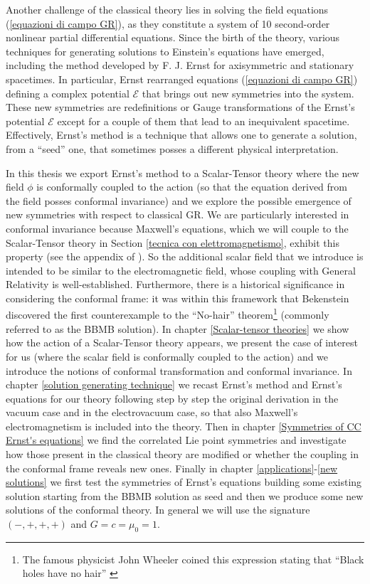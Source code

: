 Another challenge of the classical theory lies in solving the field equations (\ref{equazioni di campo GR}), as they constitute a system of 10 second-order nonlinear partial differential equations. Since the birth of the theory, various techniques for generating solutions to Einstein's equations have emerged, including the method developed by F. J. Ernst \citep{ernst1} for axisymmetric and stationary spacetimes. In particular, Ernst rearranged equations (\ref{equazioni di campo GR}) defining a complex potential $\mathcal{E}$ that brings out new symmetries into the system. These new symmetries are redefinitions or Gauge transformations of the Ernst's potential $\mathcal{E}$ except for a couple of them that lead to an inequivalent spacetime. Effectively, Ernst's method is a technique that allows one to generate a solution, from a ``seed'' one, that sometimes posses a different physical interpretation. 
\vspace{0.5 pt} 

In this thesis we export Ernst's method to a Scalar-Tensor theory where the new field $\phi$ is conformally coupled to the action (so that the equation derived from the field posses conformal invariance) and we explore the possible emergence of new symmetries with respect to classical GR. We are particularly interested in conformal invariance because Maxwell's equations, which we will couple to the Scalar-Tensor theory in Section \ref{tecnica con elettromagnetismo}, exhibit this property (see the appendix of \citep{wald2010general}). So the additional scalar field that we introduce is intended to be similar to the electromagnetic field, whose coupling with General Relativity is well-established. Furthermore, there is a historical significance in considering the conformal frame: it was within this framework that Bekenstein \citep{BBMB_sol} discovered the first counterexample to the ``No-hair'' theorem\footnote{The famous physicist John Wheeler coined this expression stating that ``Black holes have no hair'' \citep{Pagine_gialle}} (commonly referred to as the BBMB solution).
In chapter \ref{Scalar-tensor theories} we show how the action of a Scalar-Tensor theory appears, we present the case of interest for us (where the scalar field is conformally coupled to the action) and we introduce the notions of conformal transformation and conformal invariance. In chapter \ref{solution generating technique} we recast Ernst's method and Ernst's equations for our theory following step by step the original derivation in the vacuum case and in the electrovacuum case, so that also Maxwell's electromagnetism is included into the theory. Then in chapter \ref{Symmetries of CC Ernst's equations} we find the correlated Lie point symmetries and investigate how those present in the classical theory are modified or whether the coupling in the conformal frame reveals new ones. 
Finally in chapter \ref{applications}-\ref{new solutions} we first test the symmetries of Ernst's equations building some existing solution starting from the BBMB solution as seed and then we produce some new solutions of the conformal theory. In general we will use the signature $(-,+,+,+)$ and $G=c=\mu_0=1$.
